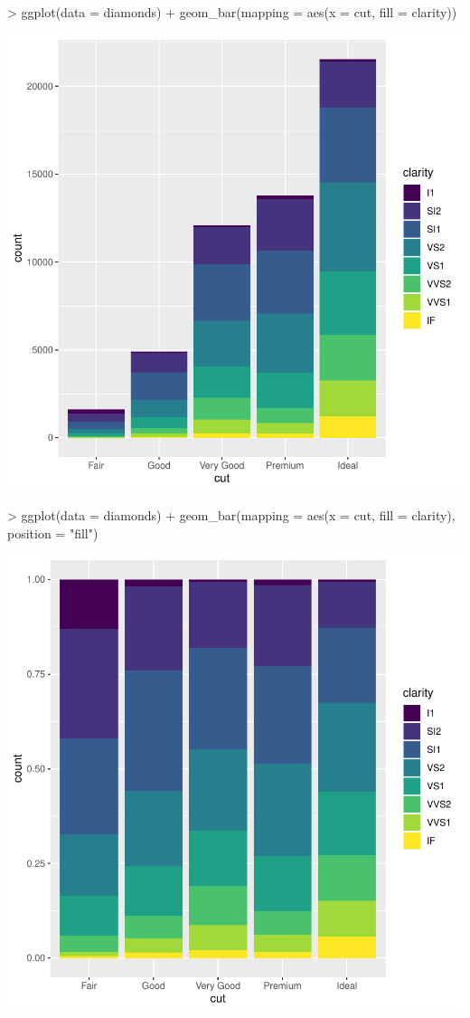 \documentclass{article}
\begin{document}
\begin{Schunk}
\begin{Sinput}
> ggplot(data = diamonds) + geom_bar(mapping = aes(x = cut, fill = clarity))
\end{Sinput}
\end{Schunk}
\includegraphics{tidigg-011}
\begin{Schunk}
\begin{Sinput}
> ggplot(data = diamonds) + geom_bar(mapping = aes(x = cut, fill = clarity), position = "fill")
\end{Sinput}
\end{Schunk}
\includegraphics{tidigg-012}
\end{document}
